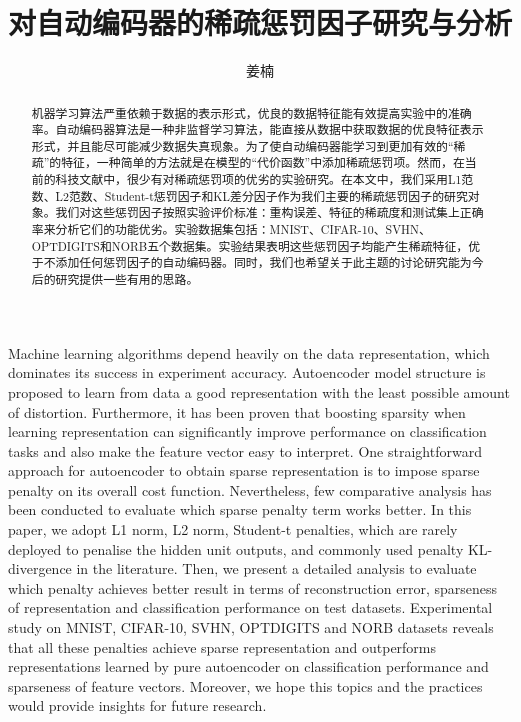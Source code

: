 \documentclass[oneside]{ZJUthesis}
\begin{document}
\songti
\title{对自动编码器的稀疏惩罚因子研究与分析}
\author{姜楠}
\makeCoverPage
\ZJUfrontmatter
\begin{abstract}
机器学习算法严重依赖于数据的表示形式，优良的数据特征能有效提高实验中的准确率。自动编码器算法是一种非监督学习算法，能直接从数据中获取数据的优良特征表示形式，并且能尽可能减少数据失真现象。为了使自动编码器能学习到更加有效的``稀疏''的特征，一种简单的方法就是在模型的``代价函数''中添加稀疏惩罚项。然而，在当前的科技文献中，很少有对稀疏惩罚项的优劣的实验研究。在本文中，我们采用L1范数、L2范数、Student-t惩罚因子和KL差分因子作为我们主要的稀疏惩罚因子的研究对象。我们对这些惩罚因子按照实验评价标准：重构误差、特征的稀疏度和测试集上正确率来分析它们的功能优劣。实验数据集包括：MNIST、CIFAR-10、SVHN、OPTDIGITS和NORB五个数据集。实验结果表明这些惩罚因子均能产生稀疏特征，优于不添加任何惩罚因子的自动编码器。同时，我们也希望关于此主题的讨论研究能为今后的研究提供一些有用的思路。


\end{abstract}

\begin{Eabstract}
Machine learning algorithms depend heavily on the data representation, which dominates its success in experiment accuracy. Autoencoder model structure is proposed to learn from data a good representation with the least possible amount of distortion. Furthermore, it has been proven that boosting sparsity when learning representation can significantly improve performance on classification tasks and also make the feature vector easy to interpret. One straightforward approach for autoencoder to obtain sparse representation is to impose sparse penalty on its overall cost function. Nevertheless, few comparative analysis has been conducted to evaluate which sparse penalty term works better. In this paper, we adopt L1 norm, L2 norm, Student-t penalties, which are rarely deployed to penalise the hidden unit outputs, and commonly used penalty KL-divergence in the literature. Then, we present a detailed analysis to evaluate which penalty achieves better result in terms of reconstruction error, sparseness of representation and classification performance on test datasets. Experimental study on MNIST, CIFAR-10, SVHN, OPTDIGITS and NORB datasets reveals that all these penalties achieve sparse representation and outperforms representations learned by pure autoencoder on classification performance and sparseness of feature vectors. Moreover, we hope this topics and the practices would provide insights for future research.




\end{Eabstract}
\ZJUcontents
\ZJUListofFigures
\ZJUListofTables
\end{document}
